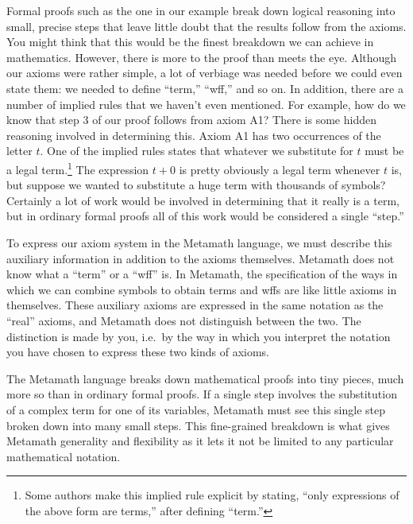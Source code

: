 Formal proofs such as the one in our example break down
logical reasoning into small, precise steps that leave little doubt that the
results follow from the axioms.  You might think that this would
be the finest breakdown we can achieve in mathematics.  However, there is more
to the proof than meets the eye. Although our axioms were rather simple, a lot
of verbiage was needed before we could even state them:  we needed to define
``term,'' ``wff,'' and so on.  In addition, there are a number of implied
rules that we haven't even mentioned. For example, how do we know that step 3
of our proof follows from axiom A1? There is some hidden reasoning involved in
determining this.  Axiom A1 has two occurrences of the letter $ t$.  One of
the implied rules states that whatever we substitute for $ t$ must be a legal
term.\footnote{Some authors make this implied rule explicit by
stating, ``only expressions of the above form are terms,'' after defining
``term.''}  The expression $ t+0$ is pretty obviously a legal term whenever $
t$ is, but suppose we wanted to substitute a huge term with thousands of
symbols?  Certainly a lot of work would be involved in determining that it
really is a term, but in ordinary formal proofs all of this work would be
considered a single ``step.''

To express our axiom system in the Metamath language, we must
describe this auxiliary information in addition to the axioms themselves.
Metamath does not know what a ``term'' or a ``wff'' is.  In Metamath, the specification of the ways in which we can combine
symbols to obtain terms and wffs are like little axioms in themselves.  These
auxiliary axioms are expressed in the same notation as the ``real''
axioms, and Metamath does not distinguish between the two.  The
distinction is made by you, i.e.\ by the way in which you interpret the
notation you have chosen to express these two kinds of axioms.

The Metamath language breaks down mathematical proofs into tiny pieces, much
more so than in ordinary formal proofs.  If a single
step involves the
substitution of a
complex term for one of its variables, Metamath must see this single step
broken down into many small steps.  This fine-grained breakdown is what gives
Metamath generality and flexibility as it lets it not be limited to any
particular mathematical notation.

